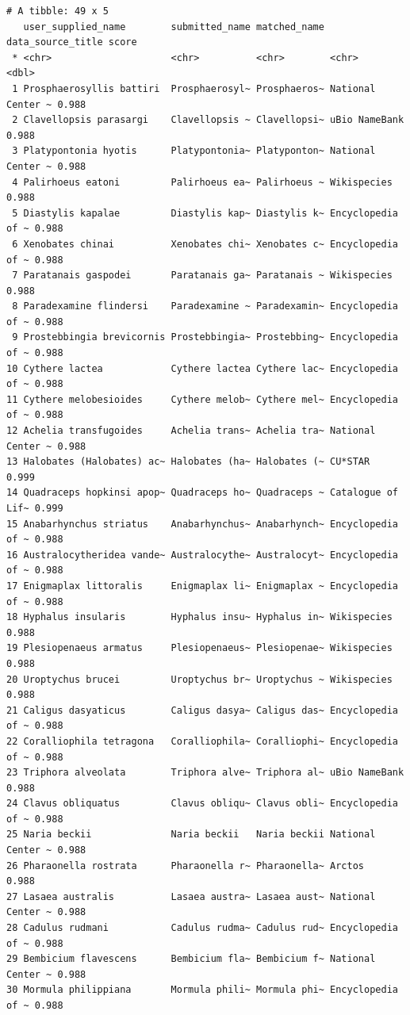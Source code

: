 \documentclass[
  letterpaper,
  DIV=11,
  numbers=noendperiod,
  oneside]{scrreprt}
\begin{document}
\begin{verbatim}
# A tibble: 49 x 5
   user_supplied_name        submitted_name matched_name data_source_title score
 * <chr>                     <chr>          <chr>        <chr>             <dbl>
 1 Prosphaerosyllis battiri  Prosphaerosyl~ Prosphaeros~ National Center ~ 0.988
 2 Clavellopsis parasargi    Clavellopsis ~ Clavellopsi~ uBio NameBank     0.988
 3 Platypontonia hyotis      Platypontonia~ Platyponton~ National Center ~ 0.988
 4 Palirhoeus eatoni         Palirhoeus ea~ Palirhoeus ~ Wikispecies       0.988
 5 Diastylis kapalae         Diastylis kap~ Diastylis k~ Encyclopedia of ~ 0.988
 6 Xenobates chinai          Xenobates chi~ Xenobates c~ Encyclopedia of ~ 0.988
 7 Paratanais gaspodei       Paratanais ga~ Paratanais ~ Wikispecies       0.988
 8 Paradexamine flindersi    Paradexamine ~ Paradexamin~ Encyclopedia of ~ 0.988
 9 Prostebbingia brevicornis Prostebbingia~ Prostebbing~ Encyclopedia of ~ 0.988
10 Cythere lactea            Cythere lactea Cythere lac~ Encyclopedia of ~ 0.988
11 Cythere melobesioides     Cythere melob~ Cythere mel~ Encyclopedia of ~ 0.988
12 Achelia transfugoides     Achelia trans~ Achelia tra~ National Center ~ 0.988
13 Halobates (Halobates) ac~ Halobates (ha~ Halobates (~ CU*STAR           0.999
14 Quadraceps hopkinsi apop~ Quadraceps ho~ Quadraceps ~ Catalogue of Lif~ 0.999
15 Anabarhynchus striatus    Anabarhynchus~ Anabarhynch~ Encyclopedia of ~ 0.988
16 Australocytheridea vande~ Australocythe~ Australocyt~ Encyclopedia of ~ 0.988
17 Enigmaplax littoralis     Enigmaplax li~ Enigmaplax ~ Encyclopedia of ~ 0.988
18 Hyphalus insularis        Hyphalus insu~ Hyphalus in~ Wikispecies       0.988
19 Plesiopenaeus armatus     Plesiopenaeus~ Plesiopenae~ Wikispecies       0.988
20 Uroptychus brucei         Uroptychus br~ Uroptychus ~ Wikispecies       0.988
21 Caligus dasyaticus        Caligus dasya~ Caligus das~ Encyclopedia of ~ 0.988
22 Coralliophila tetragona   Coralliophila~ Coralliophi~ Encyclopedia of ~ 0.988
23 Triphora alveolata        Triphora alve~ Triphora al~ uBio NameBank     0.988
24 Clavus obliquatus         Clavus obliqu~ Clavus obli~ Encyclopedia of ~ 0.988
25 Naria beckii              Naria beckii   Naria beckii National Center ~ 0.988
26 Pharaonella rostrata      Pharaonella r~ Pharaonella~ Arctos            0.988
27 Lasaea australis          Lasaea austra~ Lasaea aust~ National Center ~ 0.988
28 Cadulus rudmani           Cadulus rudma~ Cadulus rud~ Encyclopedia of ~ 0.988
29 Bembicium flavescens      Bembicium fla~ Bembicium f~ National Center ~ 0.988
30 Mormula philippiana       Mormula phili~ Mormula phi~ Encyclopedia of ~ 0.988

\end{verbatim}
\end{document}
